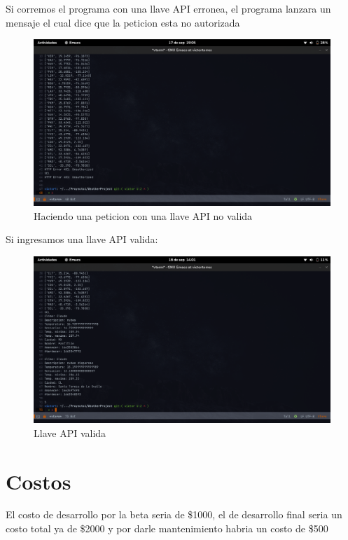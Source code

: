\documentclass[12pt]{article}
\begin{document}
Si corremos el programa con una llave API erronea, el programa lanzara un mensaje el cual dice que la peticion esta no autorizada
\begin{figure}[ht]
  \centering
  \includegraphics[scale=0.5]{figures/apimal}
  \caption{Haciendo una peticion con una llave API no valida}
\end{figure}
\newpage
Si ingresamos una llave API valida:
\begin{figure}[ht]
  \centering
  \includegraphics[scale=0.3]{figures/pruebaBuena}
  \caption{Llave API valida}
\end{figure}

\section{Costos}
El costo de desarrollo por la beta seria de \$1000, el de desarrollo final seria un costo total ya de \$2000 y por darle mantenimiento habria un costo de \$500
\end{document}
